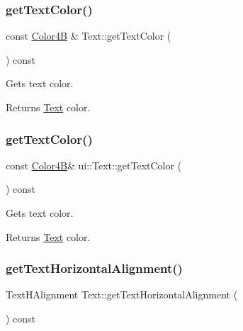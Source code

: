 \subsubsection{\texorpdfstring{get\+Text\+Color()}{getTextColor()}\hspace{0.1cm}{\footnotesize\ttfamily [1/2]}}
{\footnotesize\ttfamily const \hyperlink{structColor4B}{Color4B} \& Text\+::get\+Text\+Color (\begin{DoxyParamCaption}{ }\end{DoxyParamCaption}) const}

Gets text color.

\begin{DoxyReturn}{Returns}
\hyperlink{classui_1_1Text}{Text} color. 
\end{DoxyReturn}
\mbox{\label{classui_1_1Text_aa6da3cff534256faf9a1d91fc321f49c}} 
\subsubsection{\texorpdfstring{get\+Text\+Color()}{getTextColor()}\hspace{0.1cm}{\footnotesize\ttfamily [2/2]}}
{\footnotesize\ttfamily const \hyperlink{structColor4B}{Color4B}\& ui\+::\+Text\+::get\+Text\+Color (\begin{DoxyParamCaption}{ }\end{DoxyParamCaption}) const}

Gets text color.

\begin{DoxyReturn}{Returns}
\hyperlink{classui_1_1Text}{Text} color. 
\end{DoxyReturn}
\mbox{\label{classui_1_1Text_abf22329df9a691ea67653c2d0b04005c}} 
\subsubsection{\texorpdfstring{get\+Text\+Horizontal\+Alignment()}{getTextHorizontalAlignment()}\hspace{0.1cm}{\footnotesize\ttfamily [1/2]}}
{\footnotesize\ttfamily Text\+H\+Alignment Text\+::get\+Text\+Horizontal\+Alignment (\begin{DoxyParamCaption}{ }\end{DoxyParamCaption}) const}

